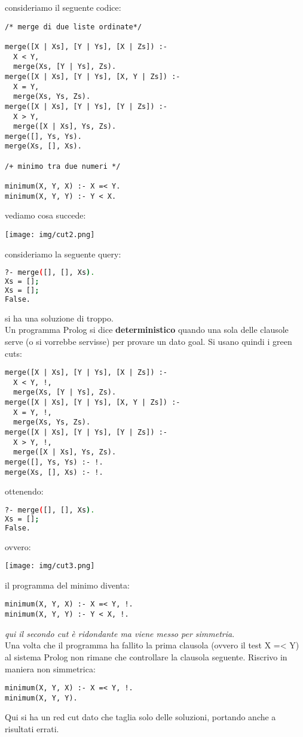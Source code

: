 \documentclass[a4paper,12pt, oneside]{book}
\begin{document}
consideriamo il seguente codice:
\begin{verbatim}
/* merge di due liste ordinate*/

merge([X | Xs], [Y | Ys], [X | Zs]) :-
  X < Y,
  merge(Xs, [Y | Ys], Zs).
merge([X | Xs], [Y | Ys], [X, Y | Zs]) :-
  X = Y,
  merge(Xs, Ys, Zs).
merge([X | Xs], [Y | Ys], [Y | Zs]) :-
  X > Y,
  merge([X | Xs], Ys, Zs).
merge([], Ys, Ys).
merge(Xs, [], Xs).

/+ minimo tra due numeri */

minimum(X, Y, X) :- X =< Y.
minimum(X, Y, Y) :- Y < X.
\end{verbatim}
vediamo cosa succede:
\begin{center}
\texttt{[image: img/cut2.png]}
\end{center}
consideriamo la seguente query:
\begin{shaded}
\begin{lstlisting}[language=bash]
?- merge([], [], Xs).
Xs = [];
Xs = [];
False.
\end{lstlisting}
\end{shaded}
si ha una soluzione di troppo.\\
Un programma Prolog si dice \textbf{deterministico} quando una sola delle clausole serve (o si vorrebbe servisse) per provare un dato goal. Si usano quindi i green cuts:
\begin{verbatim}
merge([X | Xs], [Y | Ys], [X | Zs]) :-
  X < Y, !,
  merge(Xs, [Y | Ys], Zs).
merge([X | Xs], [Y | Ys], [X, Y | Zs]) :-
  X = Y, !,
  merge(Xs, Ys, Zs).
merge([X | Xs], [Y | Ys], [Y | Zs]) :-
  X > Y, !,
  merge([X | Xs], Ys, Zs).
merge([], Ys, Ys) :- !.
merge(Xs, [], Xs) :- !.
\end{verbatim}
ottenendo:
\begin{shaded}
\begin{lstlisting}[language=bash]
?- merge([], [], Xs).
Xs = [];
False.
\end{lstlisting}
\end{shaded}
ovvero:
\begin{center}
\texttt{[image: img/cut3.png]}
\end{center}
il programma del minimo diventa:
\begin{verbatim}
minimum(X, Y, X) :- X =< Y, !.
minimum(X, Y, Y) :- Y < X, !.
\end{verbatim}
\textit{qui il secondo cut è ridondante ma viene messo per simmetria}.\\
Una volta che il programma ha fallito la prima clausola (ovvero il
test X =< Y) al sistema Prolog non rimane che controllare la
clausola seguente. Riscrivo in maniera non simmetrica:
\begin{verbatim}
minimum(X, Y, X) :- X =< Y, !.
minimum(X, Y, Y).
\end{verbatim}
Qui si ha un red cut dato che taglia solo delle soluzioni, portando anche a risultati errati.\\
\end{document}
